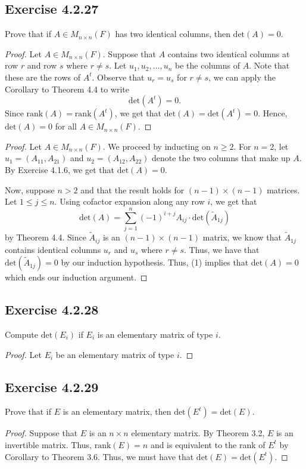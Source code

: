 \subsection*{Exercise 4.2.27} Prove that if \( A \in {M}_{n \times n}(F) \) has two identical columns, then \( \text{det}(A) = 0  \).
\begin{proof}
    Let \( A \in {M}_{n \times n}(F) \). Suppose that \( A  \) contains two identical columns at row \( r  \) and row \( s  \) where \( r \neq s  \). Let \( {u}_{1}, {u}_{2}, \dots, {u}_{n}  \) be the columns of \( A \). Note that these are the rows of \( A^{t} \). Observe that \( {u}_{r} = {u}_{s} \) for \( r \neq s  \), we can apply the Corollary to Theorem 4.4 to write  
    \[  \text{det}(A^{t}) = 0.  \]
    Since \( \text{rank}(A) = \text{rank}(A^{t}) \), we get that \( \text{det}(A) = \text{det}(A^{t}) = 0  \). Hence, \( \text{det}(A) = 0 \) for all \( A \in {M}_{n \times n}(F)  \).
\end{proof}
\begin{proof}
Let \( A \in {M}_{n \times n}(F) \). We proceed by inducting on \( n \geq 2  \). For \( n = 2  \), let \( {u}_{1} = ({A}_{11}, {A}_{21}) \) and \( {u}_{2} = ({A}_{12}, {A}_{22} ) \) denote the two columns that make up \( A  \). By Exercise 4.1.6, we get that \( \text{det}(A) = 0  \).     

Now, suppose \( n > 2  \) and that the result holds for \( (n-1) \times (n-1)  \) matrices. Let \( 1 \leq j \leq n \). Using cofactor expansion along any row \( i \), we get that 
\[  \text{det}(A) = \sum_{ j=1 }^{ n } (-1)^{i + j} {A}_{ij} \cdot \text{det}({\tilde{A}}_{1j}) \tag{1} \] by Theorem 4.4.
Since \( {\tilde{A}}_{ij} \) is an \( (n-1) \times (n-1)  \) matrix, we know that \( {\tilde{A}}_{1j} \) contains identical columns \( {u}_{r}   \) and \( {u}_{s} \) where \( r \neq s  \). Thus, we have that \( \text{det}({\tilde{A}}_{1j}) = 0  \) by our induction hypothesis. Thus, (1) implies that \( \text{det}(A) = 0  \) which ends our induction argument. 
\end{proof}

\subsection*{Exercise 4.2.28} Compute \( \text{det}({E}_{i})  \) if \( {E}_{i} \) is an elementary matrix of type \( i  \).
\begin{proof}
Let \( {E}_{i} \) be an elementary matrix of type \( i \).
\end{proof}

\subsection*{Exercise 4.2.29} Prove that if \( E  \) is an elementary matrix, then \( \text{det}(E^{t}) = \text{det}(E) \).
\begin{proof}
Suppose that \( E  \) is an \( n \times n \) elementary matrix. By Theorem 3.2, \( E  \) is an invertible matrix. Thus, \( \text{rank}(E) = n  \) and is equivalent to the rank of \( E^{t}   \) by Corollary to Theorem 3.6. Thus, we must have that \( \text{det}(E) = \text{det}(E^{t}) \).
\end{proof}



